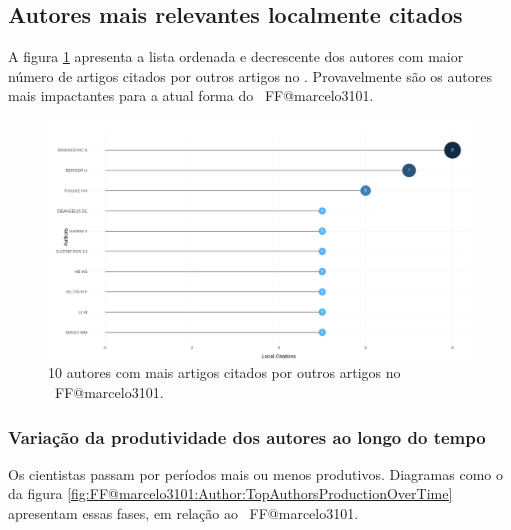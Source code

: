 \subsection{Autores mais relevantes localmente citados}

A figura \ref{fig:FF@marcelo3101:Author:LocalProduction} apresenta a lista ordenada e decrescente dos autores com maior número de artigos citados por outros artigos no \dataset. Provavelmente são os autores mais impactantes para a atual forma do \dataset\ FF@marcelo3101.

\begin{figure}
    \centering
    \includegraphics[width=1\textwidth]{exploratory-data-analysis/marcelo3101/PesqBibliogr/ForestFire/WoS-20221204/assets/MostLocalCitedAuthorsFFmarcelo3101.png}
    \caption{10 autores com mais artigos citados por outros artigos no \dataset\ FF@marcelo3101.}
    \label{fig:FF@marcelo3101:Author:LocalProduction}
\end{figure}

\subsubsection{Variação da produtividade dos autores ao longo do tempo}

Os cientistas passam por períodos mais ou menos produtivos.
Diagramas como o da figura \ref{fig:FF@marcelo3101:Author:TopAuthorsProductionOverTime} apresentam essas fases, em relação ao \dataset\ FF@marcelo3101.

